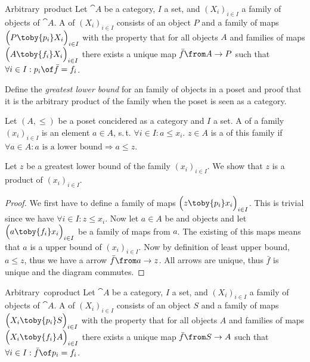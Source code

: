 \begin{definition}{Arbitrary\ product}
  Let $\cat{A}$ be a category, $I$ a set, and $(X_i)_{i \in I}$ a family of objects of $\cat{A}$.
  A  of $(X_i)_{i \in I}$ consists of an object $P$ and a family of maps
  $\Bigl(P \toby{p_i} X_i\Bigr)_{i \in I}$
  with the property that for all objects $A$ and families of maps
  $\Bigl(A \toby{f_i} X_i\Bigr)_{i \in I}$
  there exists a unique map $\bar{f}\from A \to P$ such that
  $\forall i \in I: p_i \of \bar{f} = f_i$.
\end{definition}

\begin{exercise}
  Define the \emph{greatest lower bound} for an family of objects in a poset and proof that it is the arbitrary product of the family when the poset is seen as a category.
\end{exercise}

\begin{answer}
  Let $(A, \le)$ be a poset concidered as a category and $I$ a set.
  A  of a family $(x_i)_{i\in I}$ is an element $a \in A$, s.\,t. $\forall i \in I: a \le x_i$.
  $z \in A$ is a  of this family if $\forall a \in A: \text{$a$ is a lower bound} \Rightarrow a \le z$.

  Let $z$ be a greatest lower bound of the family $(x_i)_{i\in I}$. We show that $z$ is a product of $(x_i)_{i\in I}$.
  \begin{proof}
    We first have to define a family of maps $\Bigl(z \toby{p_i} x_i\Bigr)_{i \in I}$.
    This is trivial since we have $\forall i \in I: z \le x_i$.
    Now let $a \in A$ be and objects and let $\Bigl(a \toby{f_i} x_i\Bigr)_{i \in I}$ be a family of maps from $a$.
    The existing of this maps means that $a$ is a upper bound of $(x_i)_{i\in I}$.
    Now by definition of least upper bound, $a \le z$, thus we have a arrow $\bar{f} \from a \to z$.
    All arrows are unique, thus $\bar{f}$ is unique and the diagram commutes. \qedhere
  \end{proof}
\end{answer}

\begin{definition}{Arbitrary\ coproduct}
  Let $\cat{A}$ be a category, $I$ a set, and $(X_i)_{i \in I}$ a family of objects of $\cat{A}$.
  A  of $(X_i)_{i \in I}$ consists of an object $S$ and a family of maps
  $\Bigl(X_i \toby{p_i} S\Bigr)_{i \in I}$
  with the property that for all objects $A$ and families of maps
  $\Bigl(X_i \toby{f_i} A\Bigr)_{i \in I}$
  there exists a unique map $\bar{f}\from S \to A$ such that
  $\forall i \in I: \bar{f} \of p_i = f_i$.
\end{definition}

